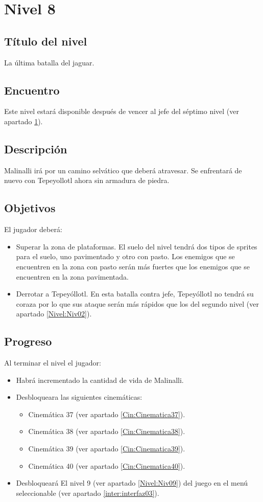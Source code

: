 	\section{Nivel 8} \label{Nivel:Niv08}
	\subsection{Título del nivel}
	La última batalla del jaguar.
	\subsection{Encuentro}
	Este nivel estará disponible después de vencer al jefe del séptimo nivel (ver apartado \ref{Nivel:Niv08}).
	\subsection{Descripción}
	Malinalli irá por un camino selvático que deberá atravesar. Se enfrentará de nuevo con Tepeyollotl ahora sin armadura de piedra.
	\subsection{Objetivos}
	El jugador deberá:
	\begin{itemize}
		\item Superar la zona de plataformas. El suelo del nivel tendrá dos tipos de sprites para el suelo, uno pavimentado y otro con pasto. Los enemigos que se encuentren en la zona con pasto serán más fuertes que los enemigos que se encuentren en la zona pavimentada. 
		\item Derrotar a Tepeyóllotl. En esta batalla contra jefe, Tepeyóllotl no tendrá su coraza por lo que sus ataque serán más rápidos que los del segundo nivel (ver apartado \ref{Nivel:Niv02}).
	\end{itemize}
	\subsection{Progreso}
	Al terminar el nivel el jugador:
\begin{itemize}
        \item Habrá incrementado la cantidad de vida de Malinalli. 
        \item Desbloqueara las siguientes cinemáticas:
\begin{itemize}
        \item Cinemática 37 (ver apartado \ref{Cin:Cinematica37}). 
        \item Cinemática 38 (ver apartado \ref{Cin:Cinematica38}).
        \item Cinemática 39 (ver apartado \ref{Cin:Cinematica39}).
        \item Cinemática 40 (ver apartado \ref{Cin:Cinematica40}).
\end{itemize}
        \item Desbloqueará El nivel 9 (ver apartado  \ref{Nivel:Niv09}) del juego en el menú seleccionable (ver apartado \ref{inter:interfaz03}).
\end{itemize}

